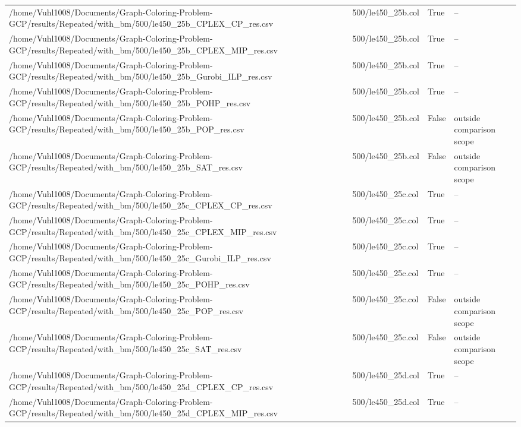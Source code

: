 \begin{table}[htbp]
\begin{tabular}{llll}
/home/Vuhl1008/Documents/Graph-Coloring-Problem-GCP/results/Repeated/with\_bm/500/le450\_25b\_CPLEX\_CP\_res.csv & 500/le450\_25b.col & True & -- \\
/home/Vuhl1008/Documents/Graph-Coloring-Problem-GCP/results/Repeated/with\_bm/500/le450\_25b\_CPLEX\_MIP\_res.csv & 500/le450\_25b.col & True & -- \\
/home/Vuhl1008/Documents/Graph-Coloring-Problem-GCP/results/Repeated/with\_bm/500/le450\_25b\_Gurobi\_ILP\_res.csv & 500/le450\_25b.col & True & -- \\
/home/Vuhl1008/Documents/Graph-Coloring-Problem-GCP/results/Repeated/with\_bm/500/le450\_25b\_POHP\_res.csv & 500/le450\_25b.col & True & -- \\
/home/Vuhl1008/Documents/Graph-Coloring-Problem-GCP/results/Repeated/with\_bm/500/le450\_25b\_POP\_res.csv & 500/le450\_25b.col & False & outside comparison scope \\
/home/Vuhl1008/Documents/Graph-Coloring-Problem-GCP/results/Repeated/with\_bm/500/le450\_25b\_SAT\_res.csv & 500/le450\_25b.col & False & outside comparison scope \\
/home/Vuhl1008/Documents/Graph-Coloring-Problem-GCP/results/Repeated/with\_bm/500/le450\_25c\_CPLEX\_CP\_res.csv & 500/le450\_25c.col & True & -- \\
/home/Vuhl1008/Documents/Graph-Coloring-Problem-GCP/results/Repeated/with\_bm/500/le450\_25c\_CPLEX\_MIP\_res.csv & 500/le450\_25c.col & True & -- \\
/home/Vuhl1008/Documents/Graph-Coloring-Problem-GCP/results/Repeated/with\_bm/500/le450\_25c\_Gurobi\_ILP\_res.csv & 500/le450\_25c.col & True & -- \\
/home/Vuhl1008/Documents/Graph-Coloring-Problem-GCP/results/Repeated/with\_bm/500/le450\_25c\_POHP\_res.csv & 500/le450\_25c.col & True & -- \\
/home/Vuhl1008/Documents/Graph-Coloring-Problem-GCP/results/Repeated/with\_bm/500/le450\_25c\_POP\_res.csv & 500/le450\_25c.col & False & outside comparison scope \\
/home/Vuhl1008/Documents/Graph-Coloring-Problem-GCP/results/Repeated/with\_bm/500/le450\_25c\_SAT\_res.csv & 500/le450\_25c.col & False & outside comparison scope \\
/home/Vuhl1008/Documents/Graph-Coloring-Problem-GCP/results/Repeated/with\_bm/500/le450\_25d\_CPLEX\_CP\_res.csv & 500/le450\_25d.col & True & -- \\
/home/Vuhl1008/Documents/Graph-Coloring-Problem-GCP/results/Repeated/with\_bm/500/le450\_25d\_CPLEX\_MIP\_res.csv & 500/le450\_25d.col & True & -- \\

\end{tabular}
\end{table}
